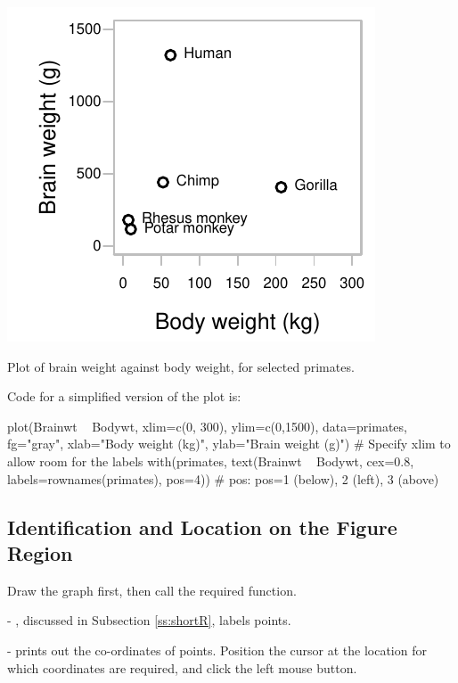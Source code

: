 \begin{marginfigure}
\begin{Schunk}


\centerline{\includegraphics[width=\textwidth]{figs/09-brain-body-1} }

\end{Schunk}
\caption{Plot of brain weight against body weight, for selected
primates.
}\label{fig:primates}
\end{marginfigure}

Code for a simplified version of the plot is:
\begin{Schunk}
\begin{Sinput}
plot(Brainwt ~ Bodywt, xlim=c(0, 300),
     ylim=c(0,1500), data=primates, fg="gray",
     xlab="Body weight (kg)",
     ylab="Brain weight (g)")
# Specify xlim to allow room for the labels
with(primates,
     text(Brainwt ~ Bodywt, cex=0.8,
          labels=rownames(primates), pos=4))
# pos: pos=1 (below), 2 (left), 3 (above)
\end{Sinput}
\end{Schunk}

\subsection*{Identification and Location on the Figure Region}
Draw the graph first, then call the required function.
\begin{itemizz}
\item[-] , discussed in Subsection \ref{ss:shortR}, labels
points.
\item[-]  prints out the co-ordinates of
points. Position the cursor at the location for which coordinates are
required, and click the left mouse button.
\end{itemizz}

